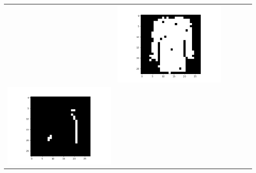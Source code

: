 \documentclass[12pt]{report}
\begin{document}
\begin{table}[H]
\begin{tabular}{  c  c  c  c  c  c }
\begin{minipage}{.15\textwidth}
    \end{minipage} &
    \begin{minipage}{.15\textwidth}
      \includegraphics[scale=0.2]{BM_c40.png}
    \end{minipage} \\ 
    \begin{minipage}{.15\textwidth}
      \includegraphics[scale=0.2]{BM_dvisual.png}
    \end{minipage} & 
    \begin{minipage}{.15\textwidth}

\end{minipage}
\end{tabular}
\end{table}
\end{document}
